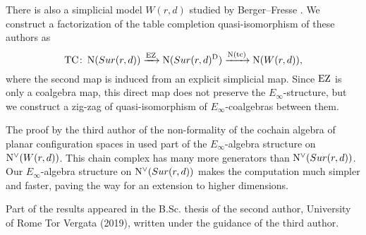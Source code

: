 There is also a simplicial model $W(r,d)$ studied by Berger--Fresse \cite{berger2004combinatorial}.
We construct a factorization of the table completion quasi-isomorphism of these authors as
\[
\mathrm{TC} \colon
\operatorname{N}(Sur(r,d))
\xrightarrow{\operatorname{EZ}}
\operatorname{N}(Sur(r,d)^{\mathrm{D}})
\xrightarrow{\operatorname{N}(\mathrm{tc})}
\operatorname{N}(W(r,d)),
\]
where the second map is induced from an explicit simplicial map.
Since $\operatorname{EZ}$ is only a coalgebra map, this direct map does not preserve the $E_\infty$-structure, but we construct a zig-zag of quasi-isomorphism of $E_\infty$-coalgebras between them.

The proof by the third author of the non-formality of the cochain algebra of planar configuration spaces in \cite{formality} used part of the $E_\infty$-algebra structure on $\operatorname{N^{\vee}}(W(r,d))$.
This chain complex has many more generators than $\operatorname{N^{\vee}}(Sur(r,d))$.
Our $E_\infty$-algebra structure on $\operatorname{N^{\vee}}(Sur(r,d))$ makes the computation much simpler and faster, paving the way for an extension to higher dimensions.

\medskip

Part of the results appeared in the B.Sc. thesis of the second author, University of Rome Tor Vergata (2019), written under the guidance of the third author.